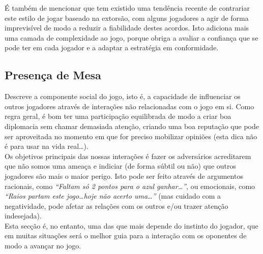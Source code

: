 \documentclass[12pt]{article}
\begin{document}
\vspace{-0.2cm}
É também de mencionar que tem existido uma tendência recente de contrariar este estilo de jogar baseado na extorsão, com alguns jogadores a agir de forma imprevisível de modo a reduzir a fiabilidade destes acordos.
Isto adiciona mais uma camada de complexidade ao jogo, porque obriga a avaliar a confiança que se pode ter em cada jogador e a adaptar a estratégia em conformidade.

\subsection{Presença de Mesa}
Descreve a componente social do jogo, isto é, a capacidade de influenciar os outros jogadores através de interações não relacionadas com o jogo em si.
Como regra geral, é bom ter uma participação equilibrada de modo a criar boa diplomacia sem chamar demasiada atenção, criando uma boa reputação que pode ser aproveitada no momento em que for preciso mobilizar opiniões (esta dica não é para usar na vida real\dots). \\
Os objetivos principais das nossas interações é fazer os adversários acreditarem que não somos uma ameaça e indiciar (de forma súbtil ou não) que outros jogadores são mais o maior perigo.
Isto pode ser feito através de argumentos racionais, como \textit{``Faltam só 2 pontos para o azul ganhar\dots''}, ou emocionais, como \textit{``Raios partam este jogo\dots hoje não acerto uma\dots''} (mas cuidado com a negatividade, pode afetar as relações com os outros e/ou trazer atenção indesejada). \\
Esta secção é, no entanto, uma das que mais depende do instinto do jogador, que em muitas situações será o melhor guia para a interação com os oponentes de modo a avançar no jogo.
\end{document}
